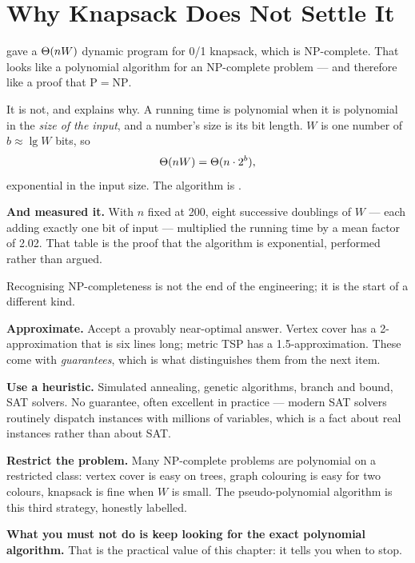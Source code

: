 \section{Why Knapsack Does Not Settle It}

\begin{alertbox}
 gave a $\Theta(nW)$ dynamic program for 0/1 knapsack, which is
NP-complete. That looks like a polynomial algorithm for an NP-complete problem
--- and therefore like a proof that $\mathrm{P} = \mathrm{NP}$.

\smallskip
It is not, and  explains why. A running time is polynomial when it
is polynomial in the \emph{size of the input}, and a number's size is its bit
length. $W$ is one number of $b \approx \lg W$ bits, so
\[ \Theta(nW) = \Theta(n \cdot 2^{b}), \]
exponential in the input size. The algorithm is .

\smallskip
\textbf{And  measured it.} With $n$ fixed at 200, eight successive
doublings of $W$ --- each adding exactly one bit of input --- multiplied the
running time by a mean factor of 2.02. That table is the proof that the
algorithm is exponential, performed rather than argued.
\end{alertbox}

\begin{conceptbox}
Recognising NP-completeness is not the end of the engineering; it is the start
of a different kind.

\begin{tightnum}
  \item \textbf{Approximate.} Accept a provably near-optimal answer. Vertex
        cover has a 2-approximation that is six lines long; metric TSP has a
        1.5-approximation. These come with \emph{guarantees}, which is what
        distinguishes them from the next item.
  \item \textbf{Use a heuristic.} Simulated annealing, genetic algorithms,
        branch and bound, SAT solvers. No guarantee, often excellent in
        practice --- modern SAT solvers routinely dispatch instances with
        millions of variables, which is a fact about real instances rather
        than about SAT.
  \item \textbf{Restrict the problem.} Many NP-complete problems are
        polynomial on a restricted class: vertex cover is easy on trees,
        graph colouring is easy for two colours, knapsack is fine when $W$ is
        small. The pseudo-polynomial algorithm is this third strategy, honestly
        labelled.
\end{tightnum}

\smallskip
\textbf{What you must not do is keep looking for the exact polynomial
algorithm.} That is the practical value of this chapter: it tells you when to
stop.
\end{conceptbox}

